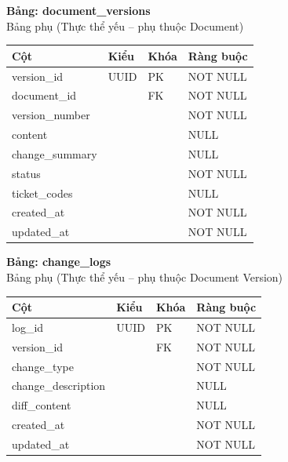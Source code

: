 \textbf{Bảng: document\_versions}\\
Bảng phụ (Thực thể yếu – phụ thuộc Document)
\begin{table}[H]
\centering
\begin{tabular}{|l|l|l|l|}
\hline
\textbf{Cột} & \textbf{Kiểu} & \textbf{Khóa} & \textbf{Ràng buộc} \\ \hline
version\_id & UUID & PK & NOT NULL \\ \hline
document\_id & & FK & NOT NULL \\ \hline
version\_number & & & NOT NULL \\ \hline
content & & & NULL \\ \hline
change\_summary & & & NULL \\ \hline
status & & & NOT NULL \\ \hline
ticket\_codes & & & NULL \\ \hline
created\_at & & & NOT NULL \\ \hline
updated\_at & & & NOT NULL \\ \hline
\end{tabular}
\end{table}

\textbf{Bảng: change\_logs}\\
Bảng phụ (Thực thể yếu – phụ thuộc Document Version)
\begin{table}[H]
\centering
\begin{tabular}{|l|l|l|l|}
\hline
\textbf{Cột} & \textbf{Kiểu} & \textbf{Khóa} & \textbf{Ràng buộc} \\ \hline
log\_id & UUID & PK & NOT NULL \\ \hline
version\_id & & FK & NOT NULL \\ \hline
change\_type & & & NOT NULL \\ \hline
change\_description & & & NULL \\ \hline
diff\_content & & & NULL \\ \hline
created\_at & & & NOT NULL \\ \hline
updated\_at & & & NOT NULL \\ \hline
\end{tabular}
\end{table}


